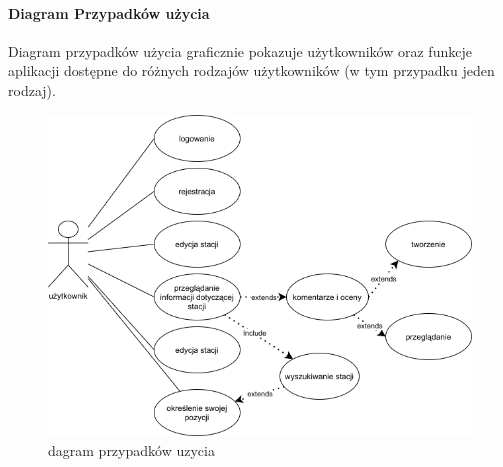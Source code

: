 \paragraph{Diagram Przypadków użycia}
Diagram przypadków użycia graficznie pokazuje użytkowników oraz funkcje aplikacji dostępne do różnych rodzajów użytkowników (w tym przypadku jeden rodzaj).
\begin{figure}[ht]
    \centering
        \includegraphics[width=0.7\linewidth]{rys02/use_case_diagram.png}
        \caption{dagram przypadków uzycia \cite{diagrams_net}}
    \label{fig:use cased iagram}
\end{figure}
\newpage
